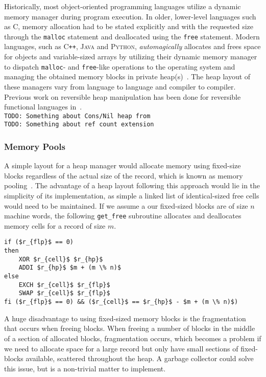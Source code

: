 Historically, most object-oriented programming languages utilize a dynamic memory manager during program execution. In older, lower-level languages such as \textsc{C}, memory allocation had to be stated explicitly and with the requested size through the \texttt{malloc} statement and deallocated using the \texttt{free} statement. Modern languages, such as \textsc{C\texttt{++}}, \textsc{Java} and \textsc{Python}, \textit{automagically} allocates and frees space for objects and variable-sized arrays by utilizing their dynamic memory manager to dispatch \texttt{malloc}- and \texttt{free}-like operations to the operating system and managing the obtained memory blocks in private heap(s)~\cite{wh:cpp_memory, bv:jvm, py:memory}. The heap layout of these managers vary from language to language and compiler to compiler.\\

Previous work on reversible heap manipulation has been done for reversible functional languages in~\cite{ha:heap, jsk:translation, tm:garbage}.\\


\texttt{TODO: Something about Cons/Nil heap from~\cite{ha:heap}}\\

\texttt{TODO: Something about ref count extension~\cite{tm:refcounting}}

\subsubsection{Memory Pools}
A simple layout for a heap manager would allocate memory using fixed-size blocks regardless of the actual size of the record, which is known as memory pooling~\cite{bk:memorypool}. The advantage of a heap layout following this approach would lie in the simplicity of its implementation, as simple a linked list of identical-sized free cells would need to be maintained. If we assume a our fixed-sized blocks are of size $n$ machine words, the following \texttt{get\_free} subroutine allocates and deallocates memory cells for a record of size $m$.
\begin{lstlisting}[mathescape=true, frame=single, caption={Allocating and deallocating records of size $m$ using block of a fixed size $n$. Code modified from~\cite{ha:heap}}, captionpos=b, language=janus]
if ($r_{flp}$ == 0) 
then
	XOR $r_{cell}$ $r_{hp}$
	ADDI $r_{hp}$ $m + (m \% n)$ 
else
	EXCH $r_{cell}$ $r_{flp}$
	SWAP $r_{cell}$ $r_{flp}$
fi ($r_{flp}$ == 0) && ($r_{cell}$ == $r_{hp}$ - $m + (m \% n)$)
\end{lstlisting}
A huge disadvantage to using fixed-sized memory blocks is the fragmentation that occurs when freeing blocks. When freeing a number of blocks in the middle of a section of allocated blocks, fragmentation occurs, which becomes a problem if we need to allocate space for a large record but only have small sections of fixed-blocks available, scattered throughout the heap. A garbage collector could solve this issue, but is a non-trivial matter to implement.\\

